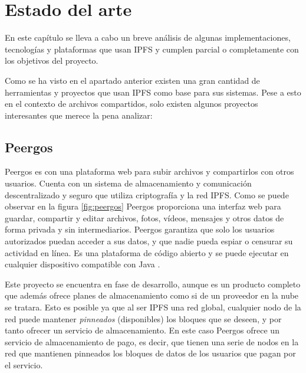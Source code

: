 \chapter{Estado del arte}\label{chap:3estadodelarte}

En este capítulo se lleva a cabo un breve análisis de algunas implementaciones, tecnologías y plataformas que usan IPFS
y cumplen parcial o completamente con los objetivos del proyecto.

Como se ha visto en el apartado anterior existen una gran cantidad de herramientas y proyectos
que usan IPFS como base para sus sistemas. Pese a esto en el contexto de archivos compartidos, solo existen
algunos proyectos interesantes que merece la pena analizar:

\section{Peergos}

Peergos es con una plataforma web para subir archivos y compartirlos con otros usuarios. Cuenta con un sistema de
almacenamiento y comunicación descentralizado y seguro que utiliza criptografía y la red IPFS. Como se puede observar en la
figura \ref{fig:peergos} Peergos proporciona una interfaz web para guardar,
compartir y editar archivos, fotos, vídeos, mensajes y otros datos de forma privada y sin intermediarios. Peergos garantiza que
solo los usuarios autorizados puedan acceder a sus datos, y que nadie pueda espiar o censurar su actividad en línea. Es una
plataforma de código abierto y se puede ejecutar en cualquier dispositivo compatible con Java \cite{PeergosPeergosP2p}.

Este proyecto se encuentra en fase de desarrollo, aunque es un producto completo que además ofrece planes de almacenamiento
como si de un proveedor en la nube se tratara. Esto es posible ya que al ser IPFS una red global,
cualquier nodo de la red puede mantener \textit{pinneados} (disponibles) los bloques que se deseen, y por tanto
ofrecer un servicio de almacenamiento. En este caso Peergos ofrece un servicio de almacenamiento de pago, es decir,
que tienen una serie de nodos en la red que mantienen pinneados los bloques de datos de los usuarios que pagan por el servicio.

